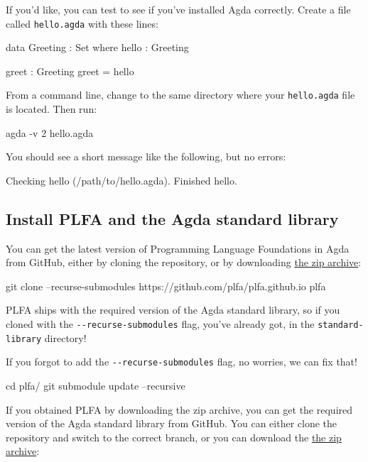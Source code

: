 If you'd like, you can test to see if you've installed Agda correctly.
Create a file called \texttt{hello.agda} with these lines:

\begin{myDisplay}
data Greeting : Set where
  hello : Greeting

greet : Greeting
greet = hello
\end{myDisplay}

From a command line, change to the same directory where your
\texttt{hello.agda} file is located. Then run:

\begin{myDisplay}
agda -v 2 hello.agda
\end{myDisplay}

You should see a short message like the following, but no errors:

\begin{myDisplay}
Checking hello (/path/to/hello.agda).
Finished hello.
\end{myDisplay}

\hypertarget{install-plfa-and-the-agda-standard-library}{%
\subsection{Install PLFA and the Agda standard
library}\label{install-plfa-and-the-agda-standard-library}}

You can get the latest version of Programming Language Foundations in
Agda from GitHub, either by cloning the repository, or by downloading
\href{https://github.com/plfa/plfa.github.io/archive/dev.zip}{the zip
archive}:

\begin{myDisplay}
git clone --recurse-submodules https://github.com/plfa/plfa.github.io plfa
\end{myDisplay}

PLFA ships with the required version of the Agda standard library, so if
you cloned with the \texttt{-\/-recurse-submodules} flag, you've already
got, in the \texttt{standard-library} directory!

If you forgot to add the \texttt{-\/-recurse-submodules} flag, no
worries, we can fix that!

\begin{myDisplay}
cd plfa/
git submodule update --recursive
\end{myDisplay}

If you obtained PLFA by downloading the zip archive, you can get the
required version of the Agda standard library from GitHub. You can
either clone the repository and switch to the correct branch, or you can
download the
\href{https://github.com/agda/agda-stdlib/releases/tag/v1.3}{the zip
archive}:

